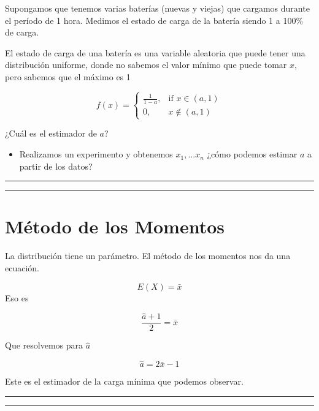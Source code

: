 \documentclass[
]{book}
\providecommand{\tightlist}{%
  \setlength{\itemsep}{0pt}\setlength{\parskip}{0pt}}
\begin{document}
Supongamos que tenemos varias baterías (nuevas y viejas) que cargamos durante el período de 1 hora. Medimos el estado de carga de la batería siendo 1 a 100\% de carga.

El estado de carga de una batería es una variable aleatoria que puede tener una distribución uniforme, donde no sabemos el valor mínimo que puede tomar \(x\), pero sabemos que el máximo es 1

\[
f(x)=
\begin{cases}
    \frac{1}{1-a},& \text{if } x\in (a,1)\\
    0,& x\notin (a,1)
\end{cases}
\]

¿Cuál es el estimador de \(a\)?

\begin{itemize}
\tightlist
\item
  Realizamos un experimento y obtenemos \(x_1,...x_n\) ¿cómo podemos estimar \(a\) a partir de los datos?
\end{itemize}

\begin{center}\rule{0.5\linewidth}{0.5pt}\end{center}

\begin{center}\rule{0.5\linewidth}{0.5pt}\end{center}

\hypertarget{muxe9todo-de-los-momentos-4}{%
\section{Método de los Momentos}\label{muxe9todo-de-los-momentos-4}}

La distribución tiene un parámetro. El método de los momentos nos da una ecuación.

\[E(X)=\bar{x}\]
Eso es

\[\frac{\hat{a}+1}{2}=\bar{x}\]

Que resolvemos para \(\hat{a}\)

\[\hat{a}=2\bar{x}-1\]

Este es el estimador de la carga mínima que podemos observar.

\begin{center}\rule{0.5\linewidth}{0.5pt}\end{center}

\begin{center}\rule{0.5\linewidth}{0.5pt}\end{center}
\end{document}
